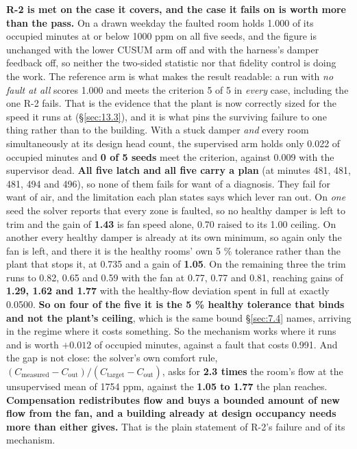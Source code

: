 \textbf{R-2 is met on the case it covers, and the case it fails on is worth more than the pass.} On
a drawn weekday the faulted room holds 1.000 of its occupied minutes at or below 1000 ppm on all
five seeds, and the figure is unchanged with the lower CUSUM arm off and with the harness's damper
feedback off, so neither the two-sided statistic nor that fidelity control is doing the work. The
reference arm is what makes the result readable: a run with \emph{no fault at all} scores 1.000 and
meets the criterion 5 of 5 in \emph{every} case, including the one R-2 fails. That is the evidence
that the plant is now correctly sized for the speed it runs at (§\ref{sec:13.3}), and it is what pins the
surviving failure to one thing rather than to the building. With a stuck damper \emph{and} every
room simultaneously at its design head count, the supervised arm holds only 0.022 of occupied
minutes and \textbf{0 of 5 seeds} meet the criterion, against 0.009 with the supervisor dead.
\textbf{All five latch and all five carry a plan} (at minutes 481, 481, 481, 494 and 496), so none
of them fails for want of a diagnosis. They fail for want of air, and the limitation each plan
states says which lever ran out. On \emph{one} seed the solver reports that every zone is faulted,
so no healthy damper is left to trim and the gain of \textbf{1.43} is fan speed alone, 0.70 raised
to its 1.00 ceiling. On another every healthy damper is already at its own minimum, so again only
the fan is left, and there it is the healthy rooms' own 5 \% tolerance rather than the plant that
stops it, at 0.735 and a gain of \textbf{1.05}. On the remaining three the trim runs to 0.82, 0.65
and 0.59 with the fan at 0.77, 0.77 and 0.81, reaching gains of \textbf{1.29, 1.62 and 1.77} with
the healthy-flow deviation spent in full at exactly 0.0500. \textbf{So on four of the five it is
the 5 \% healthy tolerance that binds and not the plant's ceiling}, which is the same bound
§\ref{sec:7.4} names, arriving in the regime where it costs something. So the mechanism works where it runs
and is worth $+0.012$ of occupied minutes, against a fault that costs 0.991. And the gap is
not close: the solver's own comfort rule, $(C_\text{measured}-C_\text{out})/(C_\text{target}-
C_\text{out})$, asks for \textbf{2.3 times} the room's flow at the unsupervised mean of 1754 ppm,
against the \textbf{1.05 to 1.77} the plan reaches. \textbf{Compensation redistributes flow and buys a
bounded amount of new flow from the fan, and a building already at design occupancy needs more than
either gives.} That is the plain statement of R-2's failure and of its mechanism.

